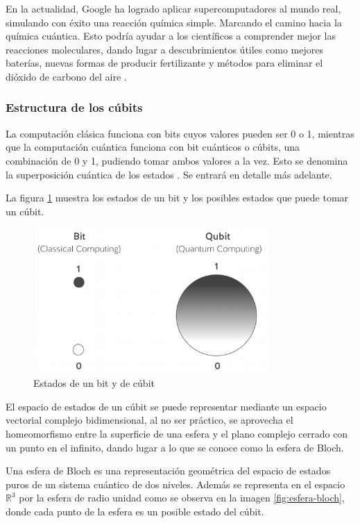En la actualidad, Google ha logrado aplicar supercomputadores al mundo real, simulando con éxito una reacción química simple. Marcando el camino hacia la química cuántica. Esto podría ayudar a los científicos a comprender mejor las reacciones moleculares, dando lugar a descubrimientos útiles como mejores baterías, nuevas formas de producir fertilizante y métodos para eliminar el dióxido de carbono del aire \cite{quimica-cuantica}.

\subsubsection{Estructura de los cúbits}

La computación clásica funciona con bits cuyos valores pueden ser 0 o 1, mientras que la computación cuántica funciona con bit cuánticos o cúbits, una combinación de 0 y 1, pudiendo tomar ambos valores a la vez. Esto se denomina la superposición cuántica de los estados \cite{computacion-cuantica-criptografia}. Se entrará en detalle más adelante.

La figura \ref{fig:bit-cubit} muestra los estados de un bit y los posibles estados que puede tomar un cúbit. 

\begin{figure}[h]
	\centering
	\includegraphics[width=0.8\textwidth]{figuras/bit_cubit.png}
	\caption{Estados de un bit y de cúbit \cite{clasica-vs-cuantica}}
	\label{fig:bit-cubit}
\end{figure}

El espacio de estados de un cúbit se puede representar mediante un espacio vectorial complejo bidimensional, al no ser práctico, se aprovecha el homeomorfismo entre la superficie de una esfera y el plano complejo cerrado con un punto en el infinito, dando lugar a lo que se conoce como la esfera de Bloch.  

Una esfera de Bloch es una representación geométrica del espacio de estados puros de un sistema cuántico de dos niveles. Además se representa en el espacio $\mathds{R}^3$ por la esfera de radio unidad como se observa en la imagen \ref{fig:esfera-bloch}, donde cada punto de la esfera es un posible estado del cúbit. 


